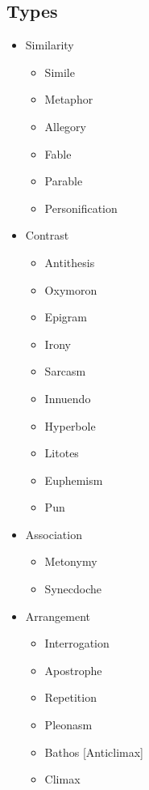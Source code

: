 \documentclass[12pt]{article}
\begin{document}
\subsection{Types}
\begin{itemize}
\item Similarity
\begin{multicols}{3}
\begin{itemize}
\item Simile
\item Metaphor
\item Allegory
\item Fable
\item Parable
\item Personification
\end{itemize}
\end{multicols}

\item Contrast
\begin{multicols}{3}
\begin{itemize}
\item Antithesis
\item Oxymoron 
\item Epigram
\item Irony
\item Sarcasm
\item Innuendo
\item Hyperbole
\item Litotes 
\item Euphemism 
\item Pun
\end{itemize}
\end{multicols}

\item Association
\begin{multicols}{3}
\begin{itemize}
\item Metonymy 
\item Synecdoche
\end{itemize}
\end{multicols}

\item Arrangement
\begin{multicols}{3}
\begin{itemize}
\item Interrogation  
\item Apostrophe  
\item Repetition  
\item Pleonasm  
\item Bathos [Anticlimax]
\item Climax
\end{itemize}
\end{multicols}
\end{itemize}
\end{document}
